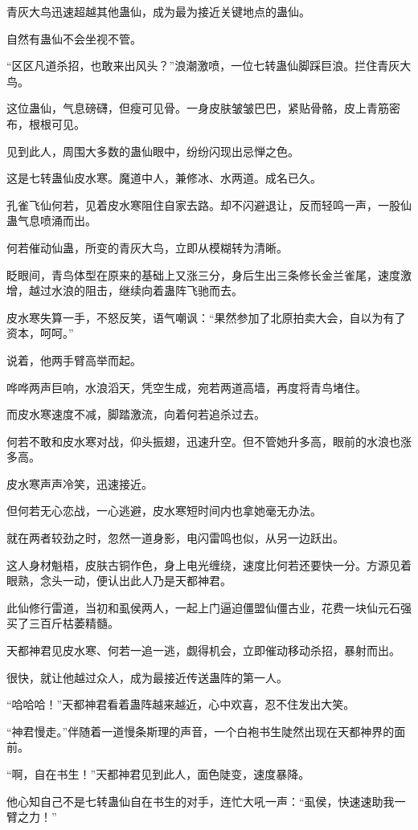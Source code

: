 \begin{this_body}
青灰大鸟迅速超越其他蛊仙，成为最为接近关键地点的蛊仙。

自然有蛊仙不会坐视不管。

“区区凡道杀招，也敢来出风头？”浪潮激喷，一位七转蛊仙脚踩巨浪。拦住青灰大鸟。

这位蛊仙，气息磅礴，但瘦可见骨。一身皮肤皱皱巴巴，紧贴骨骼，皮上青筋密布，根根可见。

见到此人，周围大多数的蛊仙眼中，纷纷闪现出忌惮之色。

这是七转蛊仙皮水寒。魔道中人，兼修冰、水两道。成名已久。

孔雀飞仙何若，见着皮水寒阻住自家去路。却不闪避退让，反而轻鸣一声，一股仙蛊气息喷涌而出。

何若催动仙蛊，所变的青灰大鸟，立即从模糊转为清晰。

眨眼间，青鸟体型在原来的基础上又涨三分，身后生出三条修长金兰雀尾，速度激增，越过水浪的阻击，继续向着蛊阵飞驰而去。

皮水寒失算一手，不怒反笑，语气嘲讽：“果然参加了北原拍卖大会，自以为有了资本，呵呵。”

说着，他两手臂高举而起。

哗哗两声巨响，水浪滔天，凭空生成，宛若两道高墙，再度将青鸟堵住。

而皮水寒速度不减，脚踏激流，向着何若追杀过去。

何若不敢和皮水寒对战，仰头振翅，迅速升空。但不管她升多高，眼前的水浪也涨多高。

皮水寒声声冷笑，迅速接近。

但何若无心恋战，一心逃避，皮水寒短时间内也拿她毫无办法。

就在两者较劲之时，忽然一道身影，电闪雷鸣也似，从另一边跃出。

这人身材魁梧，皮肤古铜作色，身上电光缠绕，速度比何若还要快一分。方源见着眼熟，念头一动，便认出此人乃是天都神君。

此仙修行雷道，当初和虱侯两人，一起上门逼迫僵盟仙僵古业，花费一块仙元石强买了三百斤枯萎精髓。

天都神君见皮水寒、何若一追一逃，觑得机会，立即催动移动杀招，暴射而出。

很快，就让他越过众人，成为最接近传送蛊阵的第一人。

“哈哈哈！”天都神君看着蛊阵越来越近，心中欢喜，忍不住发出大笑。

“神君慢走。”伴随着一道慢条斯理的声音，一个白袍书生陡然出现在天都神界的面前。

“啊，自在书生！”天都神君见到此人，面色陡变，速度暴降。

他心知自己不是七转蛊仙自在书生的对手，连忙大吼一声：“虱侯，快速速助我一臂之力！”


\end{this_body}
